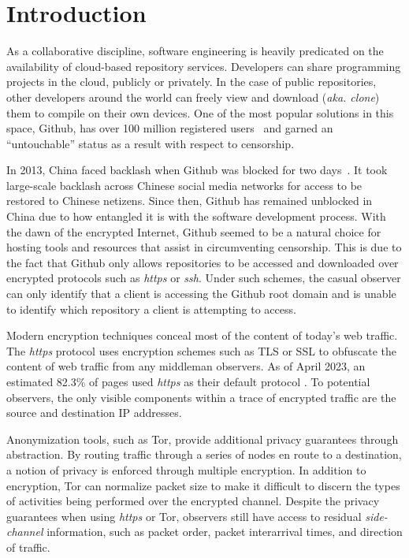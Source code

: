 \documentclass[sigconf,authorversion,nonacm]{acmart}
\begin{document}
\maketitle


\section{Introduction}

As a collaborative discipline, software engineering is heavily predicated on the availability of cloud-based repository services. Developers can share programming projects in the cloud, publicly or privately. In the case of public repositories, other developers around the world can freely view and download (\textit{aka. clone}) them to compile on their own devices. One of the most popular solutions in this space, Github, has over 100 million registered users~\cite{dohmke2023} and garned an ``untouchable'' status as a result with respect to censorship.

In 2013, China faced backlash when Github was blocked for two days~\cite{kan2013}. It took large-scale backlash across Chinese social media networks for access to be restored to Chinese netizens. Since then, Github has remained unblocked in China due to how entangled it is with the software development process. With the dawn of the encrypted Internet, Github seemed to be a natural choice for hosting tools and resources that assist in circumventing censorship. This is due to the fact that Github only allows repositories to be accessed and downloaded over encrypted protocols such as \textit{https} or \textit{ssh}. Under such schemes, the casual observer can only identify that a client is accessing the Github root domain and is unable to identify which repository a client is attempting to access.

Modern encryption techniques conceal most of the content of today's web traffic. The \textit{https} protocol uses encryption schemes such as TLS or SSL to obfuscate the content of web traffic from any middleman observers. As of April 2023, an estimated 82.3\% of pages used \textit{https} as their default protocol \cite{w3techs}. To potential observers, the only visible components within a trace of encrypted traffic are the source and destination IP addresses.

Anonymization tools, such as Tor\cite{dingledine2004tor}, provide additional privacy guarantees through abstraction. By routing traffic through a series of nodes en route to a destination, a notion of privacy is enforced through multiple encryption. In addition to encryption, Tor can normalize packet size to make it difficult to discern the types of activities being performed over the encrypted channel. Despite the privacy guarantees when using \textit{https} or Tor, observers still have access to residual \textit{side-channel} information, such as packet order, packet interarrival times, and direction of traffic.
\end{document}

